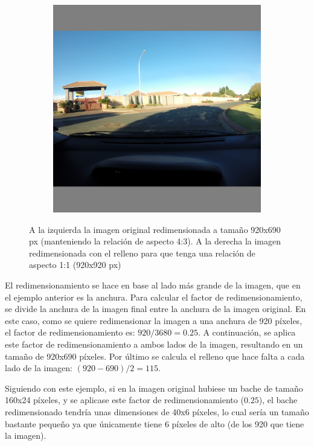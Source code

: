 \begin{figure}[H]
\begin{subfigure}[h]{0.45\linewidth}
		\includegraphics[width=\linewidth]{images/image_direct_resize_after.jpg}
	\end{subfigure}
	\caption{A la izquierda la imagen original redimensionada a tamaño 920x690 px (manteniendo la relación de aspecto 4:3). A la derecha la imagen redimensionada con el relleno para que tenga una relación de aspecto 1:1 (920x920 px)}
	\label{fig:imagedirectresize}
\end{figure}

El redimensionamiento se hace en base al lado más grande de la imagen, que en el ejemplo anterior es la anchura. Para calcular el factor de redimensionamiento, se divide la anchura de la imagen final entre la anchura de la imagen original. En este caso, como se quiere redimensionar la imagen a una anchura de 920 píxeles, el factor de redimensionamiento es: $920 / 3680 = 0.25$. A continuación, se aplica este factor de redimensionamiento a ambos lados de la imagen, resultando en un tamaño de 920x690 píxeles. Por último se calcula el relleno que hace falta a cada lado de la imagen: $(920 - 690) / 2 = 115$.

Siguiendo con este ejemplo, si en la imagen original hubiese un bache de tamaño 160x24 píxeles, y se aplicase este factor de redimensionamiento ($0.25$), el bache redimensionado tendría unas dimensiones de 40x6 píxeles, lo cual sería un tamaño bastante pequeño ya que únicamente tiene 6 píxeles de alto (de los 920 que tiene la imagen).

